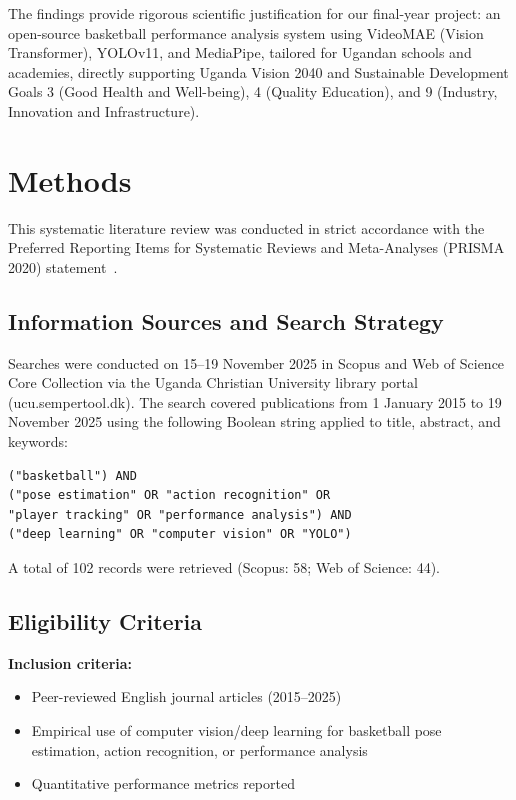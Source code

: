 \documentclass[conference]{IEEEtran}
\begin{document}
The findings provide rigorous scientific justification for our final-year project: an open-source basketball performance analysis system using VideoMAE (Vision Transformer), YOLOv11, and MediaPipe, tailored for Ugandan schools and academies, directly supporting Uganda Vision 2040 and Sustainable Development Goals 3 (Good Health and Well-being), 4 (Quality Education), and 9 (Industry, Innovation and Infrastructure).

\section{Methods}
This systematic literature review was conducted in strict accordance with the Preferred Reporting Items for Systematic Reviews and Meta-Analyses (PRISMA 2020) statement~\cite{prisma2020}.

\subsection{Information Sources and Search Strategy}
Searches were conducted on 15--19 November 2025 in Scopus and Web of Science Core Collection via the Uganda Christian University library portal (ucu.sempertool.dk). The search covered publications from 1 January 2015 to 19 November 2025 using the following Boolean string applied to title, abstract, and keywords:

\begin{verbatim}
("basketball") AND 
("pose estimation" OR "action recognition" OR 
"player tracking" OR "performance analysis") AND 
("deep learning" OR "computer vision" OR "YOLO")
\end{verbatim}

A total of 102 records were retrieved (Scopus: 58; Web of Science: 44).

\subsection{Eligibility Criteria}
\textbf{Inclusion criteria:}
\begin{itemize}
    \item Peer-reviewed English journal articles (2015--2025)
    \item Empirical use of computer vision/deep learning for basketball pose estimation, action recognition, or performance analysis
    \item Quantitative performance metrics reported
\end{itemize}
\end{document}

